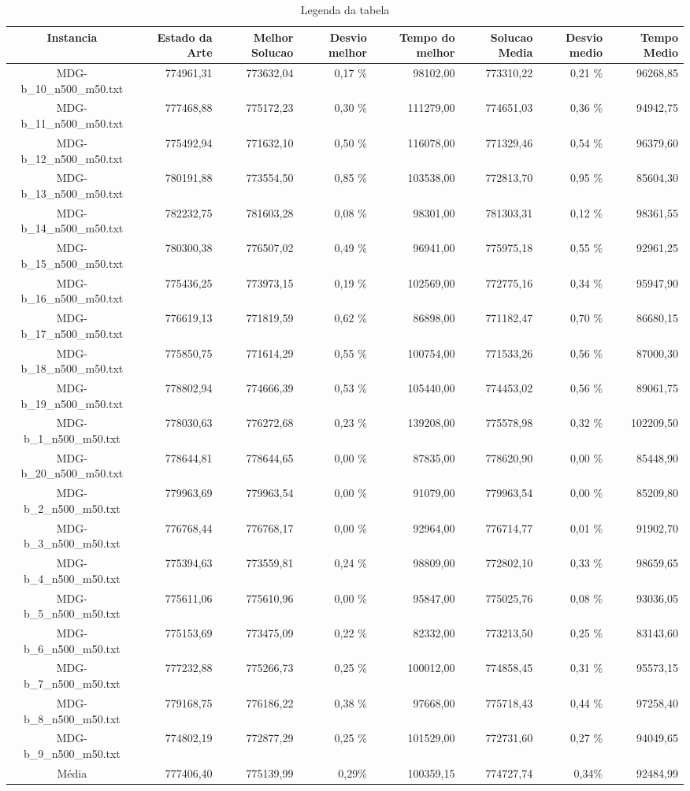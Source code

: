 \begin{landscape}
	\begin{table}[ht]
	\centering
	\begin{tabular}{| c | r | r | r | r | r | r | r |  }
\hline
Instancia&Estado da Arte&Melhor Solucao&Desvio melhor&Tempo do melhor&Solucao Media&Desvio medio&Tempo Medio\\ \hline 
		MDG-b\_10\_n500\_m50.txt&774961,31&773632,04&0,17 \%&98102,00&773310,22&0,21 \%&96268,85\\
		MDG-b\_11\_n500\_m50.txt&777468,88&775172,23&0,30 \%&111279,00&774651,03&0,36 \%&94942,75\\
		MDG-b\_12\_n500\_m50.txt&775492,94&771632,10&0,50 \%&116078,00&771329,46&0,54 \%&96379,60\\
		MDG-b\_13\_n500\_m50.txt&780191,88&773554,50&0,85 \%&103538,00&772813,70&0,95 \%&85604,30\\
		MDG-b\_14\_n500\_m50.txt&782232,75&781603,28&0,08 \%&98301,00&781303,31&0,12 \%&98361,55\\
		MDG-b\_15\_n500\_m50.txt&780300,38&776507,02&0,49 \%&96941,00&775975,18&0,55 \%&92961,25\\
		MDG-b\_16\_n500\_m50.txt&775436,25&773973,15&0,19 \%&102569,00&772775,16&0,34 \%&95947,90\\
		MDG-b\_17\_n500\_m50.txt&776619,13&771819,59&0,62 \%&86898,00&771182,47&0,70 \%&86680,15\\
		MDG-b\_18\_n500\_m50.txt&775850,75&771614,29&0,55 \%&100754,00&771533,26&0,56 \%&87000,30\\
		MDG-b\_19\_n500\_m50.txt&778802,94&774666,39&0,53 \%&105440,00&774453,02&0,56 \%&89061,75\\
		MDG-b\_1\_n500\_m50.txt&778030,63&776272,68&0,23 \%&139208,00&775578,98&0,32 \%&102209,50\\
		MDG-b\_20\_n500\_m50.txt&778644,81&778644,65&0,00 \%&87835,00&778620,90&0,00 \%&85448,90\\
		MDG-b\_2\_n500\_m50.txt&779963,69&779963,54&0,00 \%&91079,00&779963,54&0,00 \%&85209,80\\
		MDG-b\_3\_n500\_m50.txt&776768,44&776768,17&0,00 \%&92964,00&776714,77&0,01 \%&91902,70\\
		MDG-b\_4\_n500\_m50.txt&775394,63&773559,81&0,24 \%&98809,00&772802,10&0,33 \%&98659,65\\
		MDG-b\_5\_n500\_m50.txt&775611,06&775610,96&0,00 \%&95847,00&775025,76&0,08 \%&93036,05\\
		MDG-b\_6\_n500\_m50.txt&775153,69&773475,09&0,22 \%&82332,00&773213,50&0,25 \%&83143,60\\
		MDG-b\_7\_n500\_m50.txt&777232,88&775266,73&0,25 \%&100012,00&774858,45&0,31 \%&95573,15\\
		MDG-b\_8\_n500\_m50.txt&779168,75&776186,22&0,38 \%&97668,00&775718,43&0,44 \%&97258,40\\
		MDG-b\_9\_n500\_m50.txt&774802,19&772877,29&0,25 \%&101529,00&772731,60&0,27 \%&94049,65\\
\hline 		Média&777406,40&775139,99&0,29\%&100359,15&774727,74&0,34\%&92484,99\\ 
\hline
	\end{tabular}
	\caption{Legenda da tabela}
	\label{seu_label}
	\end{table}
\end{landscape}
